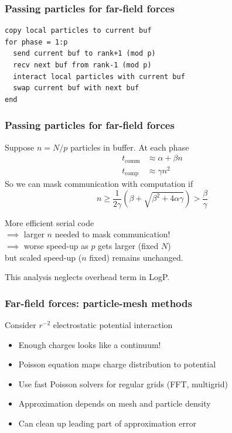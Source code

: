 \documentclass{beamer}
\begin{document}
\begin{frame}[fragile]
  \frametitle{Passing particles for far-field forces}

  \begin{center}
    
  \end{center}

\begin{verbatim}
copy local particles to current buf
for phase = 1:p
  send current buf to rank+1 (mod p)
  recv next buf from rank-1 (mod p) 
  interact local particles with current buf
  swap current buf with next buf
end
\end{verbatim}
\end{frame}



\begin{frame}
  \frametitle{Passing particles for far-field forces}

  Suppose $n = N/p$ particles in buffer.  At each phase
  \begin{align*}
    t_{\mathrm{comm}} & \approx \alpha + \beta n \\
    t_{\mathrm{comp}} & \approx \gamma n^2
  \end{align*}
  So we can mask communication with computation if
  \[
  n \geq
    \frac{1}{2\gamma} \left( \beta + \sqrt{\beta^2 + 4 \alpha \gamma} \right)
    > \frac{\beta}{\gamma}
  \]

  \vspace{4mm}
  More efficient serial code \\
  $\implies$ larger $n$ needed to mask communication! \\
  $\implies$ worse speed-up as $p$ gets larger (fixed $N$) \\
  but scaled speed-up ($n$ fixed) remains unchanged.

  \vspace{4mm}
  This analysis neglects overhead term in LogP.
  
\end{frame}


\begin{frame}
  \frametitle{Far-field forces: particle-mesh methods}

  Consider $r^{-2}$ electrostatic potential interaction
  \begin{itemize}
  \item Enough charges looks like a continuum!
  \item Poisson equation maps charge distribution to potential
  \item Use fast Poisson solvers for regular grids (FFT, multigrid)
  \item Approximation depends on mesh and particle density
  \item Can clean up leading part of approximation error
  \end{itemize}

\end{frame}
\end{document}
